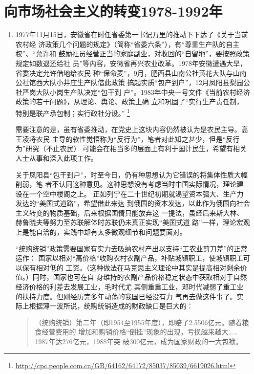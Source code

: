 \chapter{向市场社会主义的转变1978-1992年}
\label{chap:1978}

\begin{enumerate}

\item 1977年11月15日，安徽省在时任省委第一书记万里的推动下下达了《关于当前农村经
  济政策几个问题的规定》（简称“省委六条”），有``尊重生产队的自主权''、``允许和
  鼓励社员经营正当的家庭副业，对收回的“自留地”，要按照政策规定如数退还给社
  员''等内容，安徽省再兴农业改革。1978年安徽遭遇大旱，省委决定允许借地给农民
  种“保命麦”，9月，肥西县山南公社黄花大队与山南公社馆西大队小井庄生产队借此政策
  搞起实质``包产到户''，12月凤阳县梨园公社严岗大队小岗生产队决定``包干到
  户''。1983年中央一号文件《当前农村经济政策的若干问题》，从理论、舆论、政策上确
  立和巩固了``实行生产责任制，特别是联产承包制；实行政社分设。''
  \footnote{\url{http://cpc.people.com.cn/GB/64162/64172/85037/85039/6619026.html}}

  需要注意的是，虽有省委推动，在党史上这块内容仍然被认为是农民主导。高王凌将农民
  主导的软性觉悟称为``反行为''，笔者对此知之甚少，但是``反行为''研究（不止农民）
  可能会在相当多的层面上有利于国计民生，希望有相关人士从事和深入此项工作。
  
  关于凤阳县``包干到户''，时至今日，仍有种思想认为它错误的将集体性质大幅削弱，笔
  者不认同这种意见。这种思想没有考虑当时中国实际情况，理论建设在一个空中楼阁之上。
  正如列宁在二十世纪初期就渴望资本强大、生产力发达的``美国式道路''，希望借此来达
  到俄国的资本发达，以此作为俄国向社会主义转变的物质基础，后来根据国情只能放弃这
  一提法，虽经后来斯大林、赫鲁晓夫等努力至苏联解体时苏联仍未真正实现``美国式道
  路''一样，理论宏观上是能自洽的，实践中却有太多微观细节和问题要面对。

  ``统购统销''政策需要国家有实力去吸纳农村产出以支持``工农业剪刀差''的正常运作：
  国家以相对“高价格”收购农村农副产品，补贴城镇职工，使城镇职工可以保有相对低的
  工资。（这种做法在马克思主义理论中其实是提高相对剩余价值。）同时，国家也可在自
  身维持的农副产品价格稳定状态中获取相对于自然经济价格的利差去发展工业，毛时代尤
  其侧重重工业，邓时代减弱了重工业的扶持力度。但刚经历完多年动荡的我国已经没有力
  气再去做这件事了。实际上根据薄一波所说，统购统销造成的财政缺口是巨大的：
  \begin{quotation}
    （统购统销）第二年（即1954至1955年度），即赔了2.5506亿元。随着粮食经营费用的
    增加和购销价格``倒挂''现象的出现，亏损越来越大……1987年达276亿元，1988年突
    破300亿元，成为国家财政的一大包袱。
  \end{quotation}


\end{enumerate}

